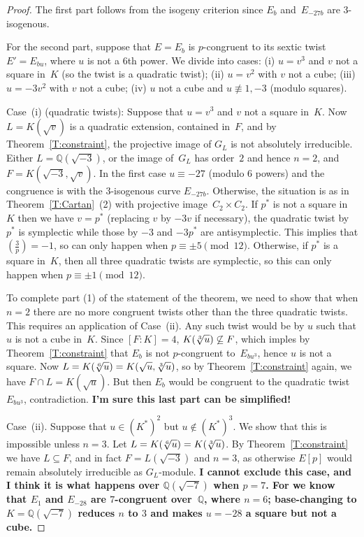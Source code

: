 \documentclass[12pt, reqno]{amsart}
\newcommand{\Q}{\mathbb{Q}}
\def\legendre#1#2{\left(\displaystyle\frac{#1}{#2}\right)}
\numberwithin{equation}{section}
\theoremstyle{definition}
\theoremstyle{remark}
\begin{document}
\begin{proof}
The first part follows from the isogeny criterion since $E_b$
and~$E_{-27b}$ are $3$-isogenous.

For the second part, suppose that $E=E_b$ is $p$-congruent to its
sextic twist $E'=E_{bu}$, where $u$ is not a $6$th power.  We divide
into cases: (i) $u=v^3$ and $v$ not a square in~$K$ (so the twist is a
quadratic twist); (ii) $u=v^2$ with $v$ not a cube; (iii) $u=-3v^2$
with $v$ not a cube; (iv) $u$ not a cube and $u\not\equiv1,-3$ (modulo
squares).

Case~(i) (quadratic twists): Suppose that $u=v^3$ and $v$ not a square
in~$K$.  Now $L=K(\sqrt{v})$ is a quadratic extension, contained
in~$F$, and by Theorem~\ref{T:constraint}, the projective image of
$G_L$ is not absolutely irreducible.  Either $L=\Q(\sqrt{-3})$, or the
image of~$G_L$ has order~$2$ and hence $n=2$, and $F=K(\sqrt{-3},
\sqrt{v})$.  In the first case $u\equiv-27$ (modulo $6$ powers) and
the congruence is with the $3$-isogenous curve $E_{-27b}$.  Otherwise,
the situation is as in Theorem~\ref{T:Cartan}~(2) with projective
image~$C_2\times C_2$.  If $p^*$ is not a square in~$K$ then we have
$v=p^*$ (replacing $v$ by $-3v$ if necessary), the quadratic twist
by~$p^*$ is symplectic while those by $-3$ and $-3p^*$ are
antisymplectic.  This implies that $\legendre{3}{p}=-1$, so can only
happen when $p\equiv\pm5\pmod{12}$.  Otherwise, if $p^*$ is a square
in~$K$, then all three quadratic twists are symplectic, so this can
only happen when $p\equiv\pm1\pmod{12}$.

To complete part (1) of the statement of the theorem, we need to show
that when $n=2$ there are no more congruent twists other than the
three quadratic twists.  This requires an application of Case~(ii).
Any such twist would be by $u$ such that $u$ is not a cube in~$K$.
Since $[F:K]=4$, $K(\root3\of{u})\not\subseteq F$, which imples by
Theorem~\ref{T:constraint} that $E_b$ is not $p$-congruent
to~$E_{bu^3}$, hence $u$ is not a square.  Now
$L=K(\root6\of{u})=K(\sqrt{u},\root3\of{u})$, so by
Theorem~\ref{T:constraint} again, we have $F\cap L = K(\sqrt{u})$.
But then $E_b$ would be congruent to the quadratic twist~$E_{bu^3}$,
contradiction. \textbf{I'm sure this last part can be simplified!}

Case~(ii).  Suppose that $u\in(K^*)^2$ but $u\not\in(K^*)^3$.  We show
that this is impossible unless $n=3$.  Let
$L=K(\root6\of{u})=K(\root3\of{u})$.  By Theorem~\ref{T:constraint} we
have $L\subseteq F$, and in fact $F=L(\sqrt{-3})$ and $n=3$, as
otherwise $E[p]$ would remain absolutely irreducible as $G_L$-module.
\textbf{I cannot exclude this case, and I think it is what happens
  over $\Q(\sqrt{-7})$ when $p=7$.  For we know that $E_1$ and
  $E_{-28}$ are $7$-congruent over~$\Q$, where $n=6$; base-changing to
  $K=\Q(\sqrt{-7})$ reduces $n$ to $3$ and makes $u=-28$ a square but
  not a cube.}


\end{proof}
\end{document}
